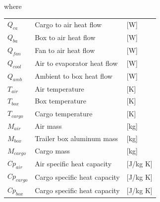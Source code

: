 where
\begin{center}
	\begin{tabular}{l p{8cm} l}
		$Q_{ca}$     & Cargo to air heat flow       & [\si{W}]                \\
		$Q_{ba}$     & Box to air heat flow         & [\si{W}]                \\
		$Q_{fan}$    & Fan to air heat flow         & [\si{W}]                \\
		$Q_{cool}$   & Air to evaporator heat flow  & [\si{W}]                \\
		$Q_{amb}$    & Ambient to box heat flow     & [\si{W}]                \\
		$T_{air}$    & Air temperature              & [\si{K}]                \\
		$T_{box}$    & Box temperature              & [\si{K}]                \\
		$T_{cargo}$  & Cargo temperature            & [\si{K}]                \\
		$M_{air}$    & Air mass                     & [\si{kg}]               \\
		$M_{box}$    & Trailer box aluminum mass    & [\si{kg}]               \\
		$M_{cargo}$  & Cargo mass                   & [\si{kg}]               \\
		$Cp_{air}$   & Air specific heat capacity   & [\si{J}/\si{kg} \si{K}] \\
		$Cp_{cargo}$ & Cargo specific heat capacity & [\si{J}/\si{kg} \si{K}] \\
		$Cp_{box}$   & Cargo specific heat capacity & [\si{J}/\si{kg} \si{K}]
	\end{tabular}
\end{center}

